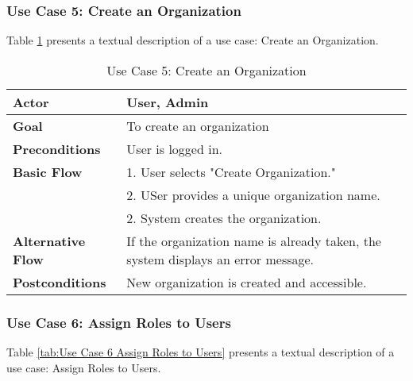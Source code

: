 \subsubsection{Use Case 5: Create an Organization}

Table \ref{tab:Use Case 5 Create an Organization} presents a textual description of a use case: Create an Organization.

\begin{table}[ht]
	\centering
	\begin{tabularx}{\textwidth}{|l|X|}
		\hline
		\textbf{Actor}            & User, Admin                                          \\
		\hline
		\textbf{Goal}             & To create an organization                            \\
		\hline
		\textbf{Preconditions}    & User is logged in.                                   \\
		\hline
		\textbf{Basic Flow}       & 1. User selects "Create Organization."               \\
		                          & 2. USer provides a unique organization name.         \\
		                          & 2. System creates the organization.                  \\
		\hline
		\textbf{Alternative Flow} &
		If the organization name is already taken, the system displays an error message. \\
		\hline
		\textbf{Postconditions}   & New organization is created and accessible.          \\
		\hline
	\end{tabularx}
	\caption{Use Case 5: Create an Organization}
	\label{tab:Use Case 5 Create an Organization}
\end{table}

\subsubsection{Use Case 6: Assign Roles to Users}

Table \ref{tab:Use Case 6 Assign Roles to Users} presents a textual description of a use case: Assign Roles to Users.

